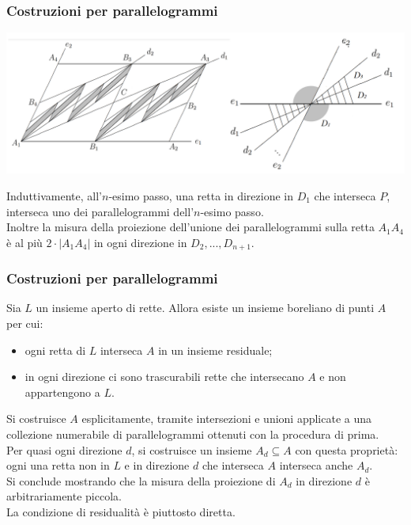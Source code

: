 \documentclass[11pt]{beamer} %
\newcommand{\<}{\langle}
\renewcommand{\>}{\rangle}
\theoremstyle{theorem}
\theoremstyle{theorem}
\theoremstyle{theorem}
\theoremstyle{theorem}
\theoremstyle{theorem}
\begin{document}
\begin{frame}[fragile]
	\frametitle{Costruzioni per parallelogrammi}
	
	\begin{center}
	\includegraphics[width=0.9\columnwidth]{prova2.png}
	\end{center}

	Induttivamente, all'$n$-esimo passo, una retta in direzione in $D_1$ che interseca $P$, interseca uno dei parallelogrammi dell'$n$-esimo passo.\\
	Inoltre la misura della proiezione dell'unione dei parallelogrammi 
	sulla retta $A_{1} A_{4}$ è al più $2 \cdot\left|A_{1} A_{4}\right|$ in ogni direzione in $D_2,...,D_{n+1}$.\\

\end{frame}



\begin{frame}
	\frametitle{Costruzioni per parallelogrammi}
	\begin{lemma}[2]
		Sia $L$ un insieme aperto di rette. Allora esiste un insieme boreliano di punti $A$ per cui:\\
		\begin{itemize}
			\item ogni retta di $L$ interseca $A$ in un insieme residuale;\\
			\item in ogni direzione ci sono trascurabili rette che intersecano $A$ e non appartengono a $L$.\\
		\end{itemize}
	\end{lemma}
	
	\pause
Si costruisce $A$ esplicitamente, tramite intersezioni e unioni applicate a una collezione numerabile di parallelogrammi ottenuti con la procedura di prima.\\ \pause
Per quasi ogni direzione $d$, si costruisce un insieme $A_{d} \subseteq A$ con questa proprietà: ogni una retta non in $L$ e in direzione $d$ che interseca $A$ interseca anche $A_{d}$.\\ \pause
Si conclude mostrando che la misura della proiezione di $A_{d}$ in direzione $d$ è arbitrariamente piccola.\\ \pause
La condizione di residualità è piuttosto diretta.
\end{frame}	
\end{document}
